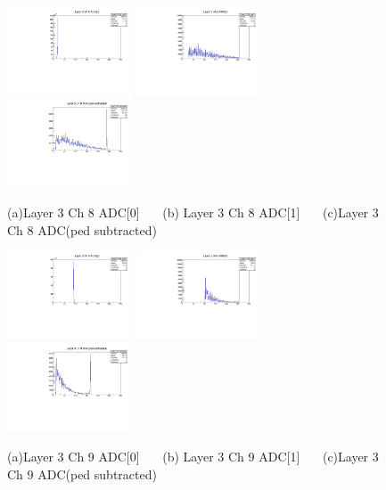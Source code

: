 \documentclass[a4paper,11pt]{article}
\theoremstyle{mytheor}
\begin{document}
\begin{figure}[H] 
\vspace*{-0.3cm} 
\includegraphics[width=0.33\textwidth,scale=0.5,trim=0 0 0 0,clip]{plotsdir/file0_test-Layer3_Ch8_adc0-1.pdf} 
\includegraphics[width=0.33\textwidth,scale=0.5,trim=0 0 0 0,clip]{plotsdir/file0_test-Layer3_Ch8_adc1-1.pdf} 
\includegraphics[width=0.33\textwidth,scale=0.5,trim=0 0 0 0,clip]{plotsdir/file0_test-Layer3_Ch8_adcPedsub-1.pdf} 
\caption{(a)Layer 3 Ch 8 ADC[0] ~~~(b) Layer 3 Ch 8 ADC[1] ~~~(c)Layer 3 Ch 8 ADC(ped subtracted) } 
\end{figure} 
\begin{figure}[H] 
\vspace*{-0.3cm} 
\includegraphics[width=0.33\textwidth,scale=0.5,trim=0 0 0 0,clip]{plotsdir/file0_test-Layer3_Ch9_adc0-1.pdf} 
\includegraphics[width=0.33\textwidth,scale=0.5,trim=0 0 0 0,clip]{plotsdir/file0_test-Layer3_Ch9_adc1-1.pdf} 
\includegraphics[width=0.33\textwidth,scale=0.5,trim=0 0 0 0,clip]{plotsdir/file0_test-Layer3_Ch9_adcPedsub-1.pdf} 
\caption{(a)Layer 3 Ch 9 ADC[0] ~~~(b) Layer 3 Ch 9 ADC[1] ~~~(c)Layer 3 Ch 9 ADC(ped subtracted) } 
\end{figure} 
\end{document}
